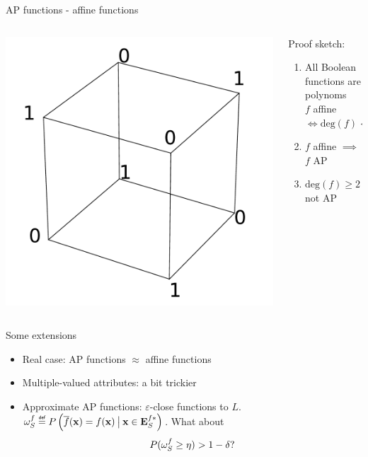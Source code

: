 \documentclass{beamer}
\begin{document}
\begin{frame}{AP functions - affine functions}
  \begin{columns}
    \begin{column}{.5\textwidth}
      \includegraphics[width=.9\textwidth]{figures/affine_functions_neighbors.pdf}
    \end{column}
    \begin{column}{.5\textwidth}
      Proof sketch:
      \begin{enumerate}
        \item All Boolean functions are polynoms\\
          $f$ affine $\iff \text{deg}(f) < 2$
        \item $f$ affine $\implies$ $f$ AP
        \item $\text{deg}(f) \geq 2 \implies f$ not AP
      \end{enumerate}
    \end{column}
  \end{columns}
\end{frame}

\begin{frame}{Some extensions}
  \begin{itemize}
    \item Real case: AP functions $\approx$ affine functions
    \item Multiple-valued attributes: a bit trickier
    \item \alert{Approximate} AP functions: $\varepsilon$-close functions to
      $L$. $\omegasf \eqdef P\left(\albl{\mathbf{x}} = f(\mathbf{x})
      \given[\big] \mathbf{x} \in \esfs\right)$. What about
      $$P(\omega_{S}^{f} \geq \eta) > 1 - \delta \text{?}$$
  \end{itemize}
\end{frame}
\end{document}
